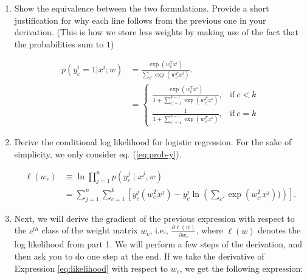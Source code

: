 \begin{enumerate}
\item {} %
Show the equivalence between the two formulations. Provide a short justification for why each line follows from the previous one in your derivation. (This is how we store less weights by making use of the fact that the probabilities sum to $1$)

\begin{align}
p(y_c^i = 1 | x^i; w)&=\frac{\exp(w_c^T x^i)}{\sum_{c'}\exp(w_{c'}^T x^i)}. \label{eq:prob-y}\\
                     &=\begin{cases}
                          \frac{\exp(w_c^T x^i)}{1+\sum_{c'=1}^{k-1}\exp(w_{c'}^T x^i)}, & \text{if}\ c<k \\
                          \frac{1}{1+\sum_{c'=1}^{k-1}\exp(w_{c'}^T x^i)}, & \text{if}\ c=k 
                        \end{cases} 
\end{align}
\begin{tcolorbox}[fit,height=8cm, width=0.9\textwidth, blank,     borderline={1pt}{-2pt},nobeforeafter]
\end{tcolorbox}

\item {} 
Derive the conditional log likelihood for logistic regression. For the sake of simplicity, we only consider eq. (\ref{eq:prob-y}).

\begin{align}
\ell(w_c)&\equiv\ln\prod_{j=1}^n p(y_c^j\mid x^j,w)\\
%
&=\sum_{j=1}^n \sum_{c=1}^{k} \left[y_c^j\left( w_c^Tx^j\right)
    -y_c^j\ln\left( \sum_{c'}\exp(w_{c'}^T x^j))\right)\right]. \label{eq:likelihood}
\end{align}

\begin{tcolorbox}[fit,height=9cm, width=0.9\textwidth, blank,     borderline={1pt}{-2pt},nobeforeafter]
\end{tcolorbox}
\pagebreak
\item {}
Next, we will derive the gradient of the previous expression with respect to the $c^{th}$ class of the weight matrix
$w_c$, i.e., $\frac{\partial \ell(w)}{\partial w_c}$, where $\ell(w)$ denotes the log likelihood from part 1. 
We will perform a few steps of the derivation, and then ask you to do one step at the end.
If we take the derivative of Expression \ref{eq:likelihood} with respect to
$w_c$, we get the following expression:


\end{enumerate}
